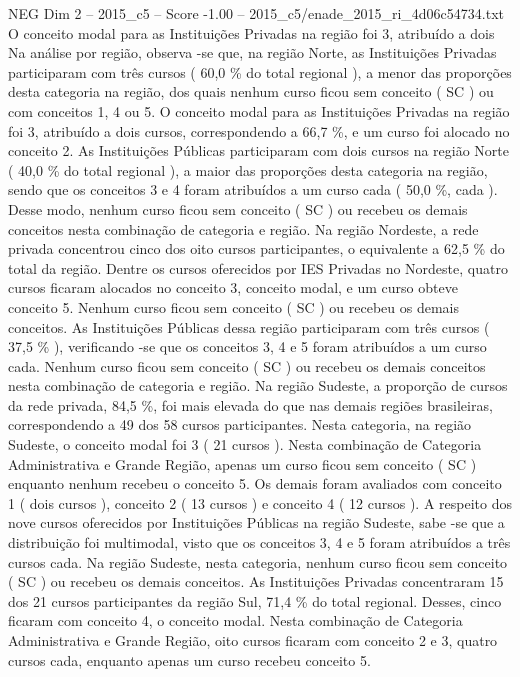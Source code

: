 \begin{textsample}{NEG Dim 2 – 2015\_c5 – Score -1.00 – 2015\_c5/enade\_2015\_ri\_4d06c54734.txt}
O conceito modal para as Instituições Privadas na região foi 3, atribuído a dois Na análise por região, observa -se que, na região Norte, as Instituições Privadas participaram com três cursos ( 60,0 \% do total regional ), a menor das proporções desta categoria na região, dos quais nenhum curso ficou sem conceito ( SC ) ou com conceitos 1, 4 ou 5.
O conceito modal para as Instituições Privadas na região foi 3, atribuído a dois cursos, correspondendo a 66,7 \%, e um curso foi alocado no conceito 2.
As Instituições Públicas participaram com dois cursos na região Norte ( 40,0 \% do total regional ), a maior das proporções desta categoria na região, sendo que os conceitos 3 e 4 foram atribuídos a um curso cada ( 50,0 \%, cada ).
Desse modo, nenhum curso ficou sem conceito ( SC ) ou recebeu os demais conceitos nesta combinação de categoria e região.
Na região Nordeste, a rede privada concentrou cinco dos oito cursos participantes, o equivalente a 62,5 \% do total da região.
Dentre os cursos oferecidos por IES Privadas no Nordeste, quatro cursos ficaram alocados no conceito 3, conceito modal, e um curso obteve conceito 5.
Nenhum curso ficou sem conceito ( SC ) ou recebeu os demais conceitos.
As Instituições Públicas dessa região participaram com três cursos ( 37,5 \% ), verificando -se que os conceitos 3, 4 e 5 foram atribuídos a um curso cada.
Nenhum curso ficou sem conceito ( SC ) ou recebeu os demais conceitos nesta combinação de categoria e região.
Na região Sudeste, a proporção de cursos da rede privada, 84,5 \%, foi mais elevada do que nas demais regiões brasileiras, correspondendo a 49 dos 58 cursos participantes.
Nesta categoria, na região Sudeste, o conceito modal foi 3 ( 21 cursos ).
Nesta combinação de Categoria Administrativa e Grande Região, apenas um curso ficou sem conceito ( SC ) enquanto nenhum recebeu o conceito 5.
Os demais foram avaliados com conceito 1 ( dois cursos ), conceito 2 ( 13 cursos ) e conceito 4 ( 12 cursos ).
A respeito dos nove cursos oferecidos por Instituições Públicas na região Sudeste, sabe -se que a distribuição foi multimodal, visto que os conceitos 3, 4 e 5 foram atribuídos a três cursos cada.
Na região Sudeste, nesta categoria, nenhum curso ficou sem conceito ( SC ) ou recebeu os demais conceitos.
As Instituições Privadas concentraram 15 dos 21 cursos participantes da região Sul, 71,4 \% do total regional.
Desses, cinco ficaram com conceito 4, o conceito modal.
Nesta combinação de Categoria Administrativa e Grande Região, oito cursos ficaram com conceito 2 e 3, quatro cursos cada, enquanto apenas um curso recebeu conceito 5.

\end{textsample}

